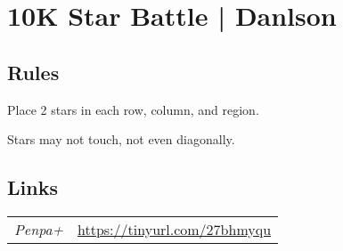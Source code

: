 \section{10K Star Battle | {\normalfont Danlson}}
\label{sec:34-10k-star-battle-danlson}

\subsection*{Rules}
\begin{markdown}
Place 2 stars in each row, column, and region.

Stars may not touch, not even diagonally.
\end{markdown}
\subsection*{Links}
\begin{tabularx}{\textwidth}{l X}
\emph{Penpa+} & \url{https://tinyurl.com/27bhmyqu} \\
\end{tabularx}
\pagebreak
